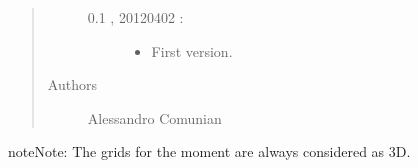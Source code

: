 \documentclass[letterpaper,10pt,english]{sphinxmanual}
\begin{document}
\begin{quote}
\begin{description}
\begin{description}
\item[{0.1 , 2012\sphinxhyphen{}04\sphinxhyphen{}02 :}] \leavevmode\begin{itemize}
\item {} 
First version.

\end{itemize}

\end{description}

\item[{Authors}] \leavevmode
Alessandro Comunian

\end{description}\end{quote}

\begin{sphinxadmonition}{note}{Note:}
The grids for the moment are always considered as 3D.
\end{sphinxadmonition}
\end{document}
